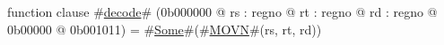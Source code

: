 function clause #\hyperref[zdecode]{decode}# (0b000000 @ rs : regno @ rt : regno @ rd : regno @ 0b00000 @ 0b001011) =
  #\hyperref[zSome]{Some}#(#\hyperref[zMOVN]{MOVN}#(rs, rt, rd))
